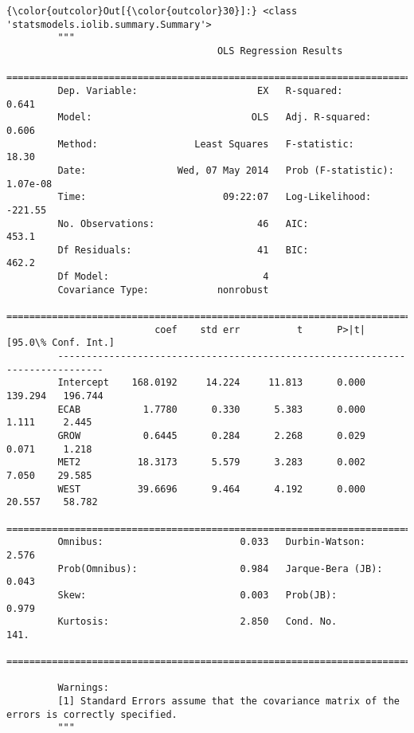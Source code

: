 \documentclass{article}
\begin{document}
            \begin{Verbatim}[commandchars=\\\{\}]
{\color{outcolor}Out[{\color{outcolor}30}]:} <class 'statsmodels.iolib.summary.Summary'>
         """
                                     OLS Regression Results                            
         ==============================================================================
         Dep. Variable:                     EX   R-squared:                       0.641
         Model:                            OLS   Adj. R-squared:                  0.606
         Method:                 Least Squares   F-statistic:                     18.30
         Date:                Wed, 07 May 2014   Prob (F-statistic):           1.07e-08
         Time:                        09:22:07   Log-Likelihood:                -221.55
         No. Observations:                  46   AIC:                             453.1
         Df Residuals:                      41   BIC:                             462.2
         Df Model:                           4                                         
         Covariance Type:            nonrobust                                         
         ==============================================================================
                          coef    std err          t      P>|t|      [95.0\% Conf. Int.]
         ------------------------------------------------------------------------------
         Intercept    168.0192     14.224     11.813      0.000       139.294   196.744
         ECAB           1.7780      0.330      5.383      0.000         1.111     2.445
         GROW           0.6445      0.284      2.268      0.029         0.071     1.218
         MET2          18.3173      5.579      3.283      0.002         7.050    29.585
         WEST          39.6696      9.464      4.192      0.000        20.557    58.782
         ==============================================================================
         Omnibus:                        0.033   Durbin-Watson:                   2.576
         Prob(Omnibus):                  0.984   Jarque-Bera (JB):                0.043
         Skew:                           0.003   Prob(JB):                        0.979
         Kurtosis:                       2.850   Cond. No.                         141.
         ==============================================================================
         
         Warnings:
         [1] Standard Errors assume that the covariance matrix of the errors is correctly specified.
         """
\end{Verbatim}
        
\end{document}
